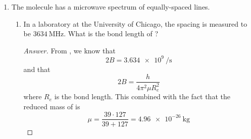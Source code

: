 \documentclass[../psets.tex]{subfiles}
\begin{document}
\begin{enumerate}
\begin{enumerate}
\begin{proof}[Answer]
\begin{align*}
                &= \frac{N_2N_0}{\alpha}\int_{-\infty}^\infty \xi H_2(\xi)H_0(\xi)\e[-\xi^2]\dd{\xi}\\
                &= \frac{N_2N_0}{\alpha}\int_{-\infty}^\infty [2H_1(\xi)+\tfrac{1}{2}H_3(\xi)]H_0(\xi)\e[-\xi^2]\dd{\xi}\\
                &= 0
            \end{align*}
            Therefore,  since the overall transition dipole moment is equal to zero.
        \end{proof}
        \item In general, what may be said regarding transitions between even states?
        \begin{proof}[Answer]
            Transitions between even states are .
        \end{proof}
        \item Are these results consistent with the more general selection rules derived in class?
        \begin{proof}[Answer]
            . In class, we derived that only transitions with $\Delta n=\pm 1$ may be allowed, so transitions between even states (with $\Delta n=\pm 2,\pm 4,\pm 6,\dots$) should certainly be forbidden.
        \end{proof}
    \end{enumerate}
    \item The molecule  has a microwave spectrum of equally-spaced lines.
    \begin{enumerate}
        \item In a laboratory at the University of Chicago, the spacing is measured to be $\SI{3634}{\mega\hertz}$. What is the bond length of ?
        \begin{proof}[Answer]
            From \textcite{bib:McQuarrieSimon}, we know that
            \begin{equation*}
                2B = \SI{3.634e9}{\per\second}
            \end{equation*}
            and that
            \begin{equation*}
                2B = \frac{h}{4\pi^2\mu R_e^2}
            \end{equation*}
            where $R_e$ is the bond length. This combined with the fact that the reduced mass of  is
            \begin{equation*}
                \mu = \frac{39\cdot 127}{39+127} = \SI{4.96e-26}{\kilo\gram}

\end{equation*}
\end{proof}
\end{enumerate}
\end{enumerate}
\end{document}
